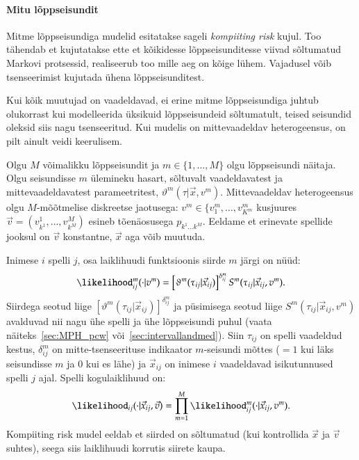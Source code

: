 \documentclass[a4paper]{article}
\numberwithin{equation}{subsection}
\begin{document}
\clearpage
\paragraph{Mitu lõppseisundit}

Mitme lõppseisundiga mudelid esitatakse sageli \emph{kompiiting risk}
kujul.  Too tähendab et kujutatakse ette et kõikidesse
lõppseisunditesse viivad sõltumatud Markovi protsessid, realiseerub
too mille aeg on kõige lühem.  Vajadusel võib tsenseerimist kujutada
ühena lõppseisunditest.

Kui kõik muutujad on vaadeldavad, ei erine mitme lõppseisundiga juhtub
olukorrast kui modelleerida üksikuid lõppseisundeid sõltumatult,
teised seisundid oleksid siis nagu tsenseeritud.  Kui mudelis on
mittevaadeldav heterogeensus, on pilt ainult veidi keerulisem.

Olgu $M$ võimalikku lõppseisundit ja $m \in \{1,\dots,M\}$ olgu
lõppseisundi näitaja.  Olgu seisundisse $m$ ülemineku hasart,
sõltuvalt vaadeldavatest ja mittevaadeldavatest parameetritest,
$\vartheta^m(\tau|\vec{x}, v^m)$.  Mittevaadeldav heterogeensus olgu
$M$-mõõtmelise diskreetse jaotusega: $v^m \in \{v_1^m, \dots,
v_{K^m}^m$ kusjuures $\vec{v} = (v_{k^1}^1, \dots, v_{k^M}^M)$ esineb
tõenäosusega $p_{k^1 \dots k^M}$.  Eeldame et erinevate spellide
jooksul on $\vec{v}$ konstantne, $\vec{x}$ aga võib muutuda.

Inimese $i$ spelli $j$, osa laiklihuudi funktsioonis siirde $m$ järgi
on nüüd:
\begin{equation}
  \likelihood_{ij}^m(\cdot|v^m) = 
  \left[ \vartheta^m(\tau_{ij}|\vec{x}_{ij}) \right]^{\delta_{ij}^m} 
  S^m(\tau_{ij}|\vec{x}_{ij},v^m).
\end{equation}
Siirdega seotud liige $\left[ \vartheta^m(\tau_{ij}|\vec{x}_{ij})
\right]^{\delta_{ij}^m}$ ja püsimisega seotud liige
$S^m(\tau_{ij}|\vec{x}_{ij},v^m)$ avalduvad nii nagu ühe spelli ja ühe
lõppseisundi puhul (vaata näiteks~\ref{sec:MPH_pcw}
või~\ref{sec:intervallandmed}).  Siin $\tau_{ij}$ on spelli vaadeldud
kestus, $\delta_{ij}^m$ on mitte-tsenseerituse indikaator $m$-seisundi
mõttes ($=1$ kui läks seisundisse $m$ ja 0 kui es lähe) ja
$\vec{x}_{ij}$ on inimese $i$ vaadeldavad isikutunnused spelli $j$
ajal.  Spelli kogulaiklihuud on:
\begin{equation}
  \likelihood_{ij}(\cdot|\vec{x}_{ij},\vec{v}) = 
  \prod_{m=1}^M
  \likelihood_{ij}^m(\cdot|\vec{x}_{ij}, v^m).
\end{equation}
Kompiiting risk mudel eeldab et siirded on sõltumatud (kui kontrollida
$\vec{x}$ ja $\vec{v}$ suhtes), seega siis laiklihuudi korrutis
siirete kaupa.  
\end{document}
